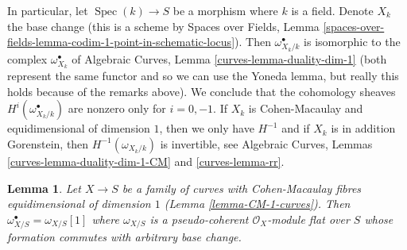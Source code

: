 \documentclass{stacks-project}
\theoremstyle{plain}
\newtheorem{lemma}[subsection]{Lemma}
\theoremstyle{definition}
\theoremstyle{remark}
\numberwithin{equation}{subsection}
\def\Spec{\mathop{\mathrm{Spec}}}
\begin{document}
\medskip\noindent
In particular, let $\Spec(k) \to S$ be a morphism where $k$ is a field.
Denote $X_k$ the base change (this is a scheme by
Spaces over Fields, Lemma
\ref{spaces-over-fields-lemma-codim-1-point-in-schematic-locus}).
Then $\omega_{X_k/k}^\bullet$ is isomorphic
to the complex $\omega_{X_k}^\bullet$ of
Algebraic Curves, Lemma \ref{curves-lemma-duality-dim-1}
(both represent the same functor and so we can use the Yoneda lemma,
but really this holds because of the remarks above).
We conclude that the cohomology sheaves
$H^i(\omega_{X_k/k}^\bullet)$
are nonzero only for $i = 0, -1$.
If $X_k$ is Cohen-Macaulay and equidimensional of dimension $1$,
then we only have $H^{-1}$ and if $X_k$ is in addition Gorenstein,
then $H^{-1}(\omega_{X_k/k})$ is invertible, see
Algebraic Curves, Lemmas \ref{curves-lemma-duality-dim-1-CM}
and \ref{curves-lemma-rr}.

\begin{lemma}
\label{lemma-CM-dualizing}
Let $X \to S$ be a family of curves with Cohen-Macaulay fibres
equidimensional of dimension $1$ (Lemma \ref{lemma-CM-1-curves}).
Then $\omega_{X/S}^\bullet = \omega_{X/S}[1]$ where $\omega_{X/S}$
is a pseudo-coherent $\mathcal{O}_X$-module flat over $S$ whose
formation commutes with arbitrary base change.
\end{lemma}
\end{document}
